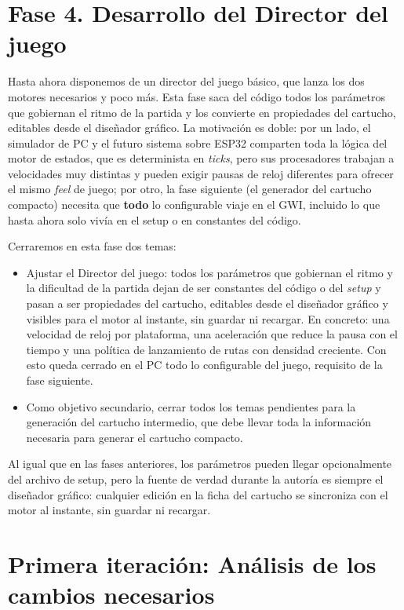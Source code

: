 \section{Fase 4. Desarrollo del Director del juego}
\label{sec:F4Intro}

Hasta ahora disponemos de un director del juego básico, que lanza los
dos motores necesarios y poco más. Esta fase saca del código todos los
parámetros que gobiernan el ritmo de la partida y los convierte en
propiedades del cartucho, editables desde el diseñador gráfico. La
motivación es doble: por un lado, el simulador de PC y el futuro
sistema sobre ESP32 comparten toda la lógica del motor de estados,
que es determinista en \textit{ticks}, pero sus procesadores trabajan
a velocidades muy distintas y pueden exigir pausas de reloj diferentes
para ofrecer el mismo \textit{feel} de juego; por otro, la fase
siguiente (el generador del cartucho compacto) necesita que
\textbf{todo} lo configurable viaje en el GWI, incluido lo que hasta
ahora solo vivía en el setup o en constantes del código.

Cerraremos en esta fase dos temas:

\begin{itemize}
	\item Ajustar el Director del juego: todos los parámetros que
	gobiernan el ritmo y la dificultad de la partida dejan de ser
	constantes del código o del \emph{setup} y pasan a ser propiedades
	del cartucho, editables desde el diseñador gráfico y visibles para el
	motor al instante, sin guardar ni recargar. En concreto: una
	velocidad de reloj por plataforma, una aceleración que reduce la
	pausa con el tiempo y una política de lanzamiento de rutas con
	densidad creciente. Con esto queda cerrado en el PC todo lo
	configurable del juego, requisito de la fase siguiente.
	\item Como objetivo secundario, cerrar todos los temas pendientes
	para la generación del cartucho intermedio, que debe llevar toda la
	información necesaria para generar el cartucho compacto.
\end{itemize}

Al igual que en las fases anteriores, los parámetros pueden llegar
opcionalmente del archivo de setup, pero la fuente de verdad durante
la autoría es siempre el diseñador gráfico: cualquier edición en la
ficha del cartucho se sincroniza con el motor al instante, sin
guardar ni recargar.

\section{Primera iteración: Análisis de los cambios necesarios}
\label{sec:F4I1}

